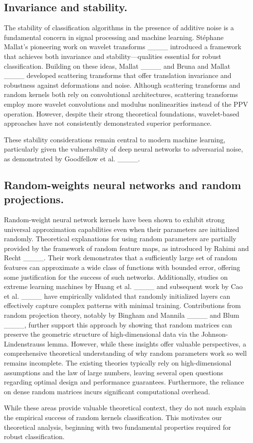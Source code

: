 \subsection{Invariance and stability.}


The stability of classification algorithms in the presence of additive noise is a fundamental concern in signal processing and machine learning. Stéphane Mallat's pioneering work on wavelet transforms ____ introduced a framework that achieves both invariance and stability—qualities essential for robust classification. Building on these ideas, Mallat ____ and Bruna and Mallat ____ developed scattering transforms that offer translation invariance and robustness against deformations and noise. Although scattering transforms and random kernels both rely on convolutional architectures, scattering transforms employ more  wavelet convolutions and modulus nonlinearities instead of the PPV operation. However, despite their strong theoretical foundations, wavelet-based approaches have not consistently demonstrated superior performance.

These stability considerations remain central to modern machine learning, particularly given the vulnerability of deep neural networks to adversarial noise, as demonstrated by Goodfellow et al. ____.


\subsection{Random-weights neural networks and random projections.}

Random-weight neural network kernels have been shown to exhibit strong universal approximation capabilities even when their parameters are initialized randomly. Theoretical explanations for using random parameters are partially provided by the framework of random feature maps, as introduced by Rahimi and Recht ____. Their work demonstrates that a sufficiently large set of random features can approximate a wide class of functions with bounded error, offering some justification for the success of such networks. Additionally, studies on extreme learning machines by Huang et al. ____ and subsequent work by Cao et al. ____ have empirically validated that randomly initialized layers can effectively capture complex patterns with minimal training. Contributions from random projection theory, notably by Bingham and Mannila ____ and Blum ____, further support this approach by showing that random matrices can preserve the geometric structure of high-dimensional data via the Johnson-Lindenstrauss lemma. However, while these insights offer valuable perspectives, a comprehensive theoretical understanding of why random parameters work so well remains incomplete. The existing theories typically rely on high-dimensional assumptions and the law of large numbers, leaving several open questions regarding optimal design and performance guarantees. Furthermore, the reliance on dense random matrices incurs significant computational overhead.

While these areas provide valuable theoretical context, they do not much explain the empirical success of random kernels classification. This motivates our theoretical analysis, beginning with two fundamental properties required for robust classification.